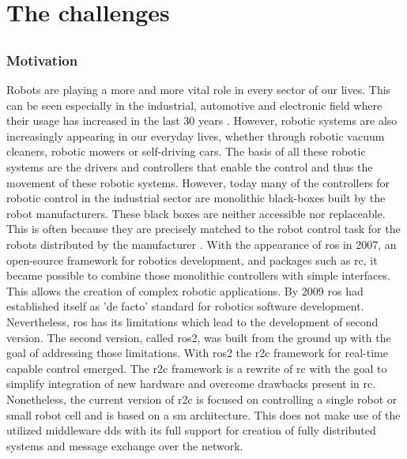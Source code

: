 \part{The challenges}
\chapter{}
\label{sec:Introduction}
\section{Motivation}
Robots are playing a more and more vital role in every sector of our lives. This can be seen especially in the industrial, automotive and electronic field where their usage has increased in the last 30 years \cite{cheng_rise_2019, bilancia_overview_2023}. However, robotic systems are also increasingly appearing in our everyday lives, whether through robotic vacuum cleaners, robotic mowers or self-driving cars. The basis of all these robotic systems are the drivers and controllers that enable the control and thus the movement of these robotic systems. However, today many of the controllers for robotic control in the industrial sector are monolithic black-boxes built by the robot manufacturers. These black boxes are neither accessible nor replaceable. This is often because they are precisely matched to the robot control task for the robots distributed by the manufacturer \cite{puck_distributed_2020, plasberg_towards_2022}. \newline
With the appearance of \gls{ros} in 2007, an open-source framework for robotics development, and packages such as \gls{rc}, it became possible to combine those monolithic controllers with simple interfaces. This allows the creation of complex robotic applications. By 2009 \gls{ros} had established itself as 'de facto' standard for robotics software development. Nevertheless, \gls{ros} has its limitations which lead to the development of second version. The second version, called \gls{ros2}, was built from the ground up with the goal of addressing those limitations. \newline
With \gls{ros2} the \gls{r2c} framework for real-time capable control emerged. The \gls{r2c} framework is a rewrite of \gls{rc} with the goal to simplify integration of new hardware and overcome drawbacks present in \gls{rc}. Nonetheless, the current version of \gls{r2c} is focused on controlling a single robot or small robot cell and is based on a \gls{sm} architecture. This does not make use of the utilized middleware \gls{dds} with its full support for creation of fully distributed systems and message exchange over the network. \newline

